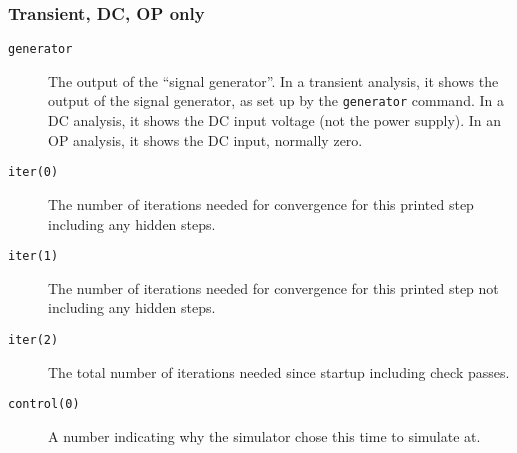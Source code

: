 \subsubsection{Transient, DC, OP only}
\begin{description}

\item[{\tt generator}] The output of the ``signal generator''.  In a 
transient analysis, it shows the output of the signal generator, as set 
up by the {\tt generator} command.  In a DC analysis, it shows the DC
input voltage (not the power supply).  In an OP analysis, it shows the
DC input, normally zero.  

\item[{\tt iter(0)}] The number of iterations needed for convergence for
this printed step including any hidden steps.

\item[{\tt iter(1)}] The number of iterations needed for convergence for
this printed step not including any hidden steps.

\item[{\tt iter(2)}] The total number of iterations needed since startup
including check passes.

\item[{\tt control(0)}] A number indicating why the simulator chose this
time to simulate at.
\end{description}
